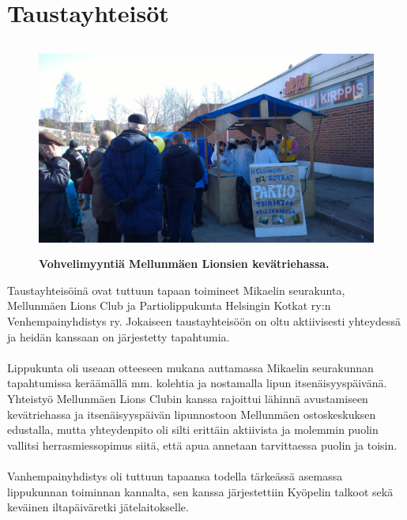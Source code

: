 \section{Taustayhteisöt}
\begin{figure}[htb]
	\begin{center}
		\includegraphics[height=7cm]{lettukestit.jpg}
	\end{center}
	\captionsetup{labelformat=empty}
	\caption{\textbf{Vohvelimyyntiä Mellunmäen Lionsien kevätriehassa.}}
\end{figure}

Taustayhteisöinä ovat tuttuun tapaan toimineet Mikaelin seurakunta, Mellunmäen Lions Club ja Partiolippukunta Helsingin Kotkat ry:n Venhempainyhdistys ry. Jokaiseen taustayhteisöön on oltu aktiivisesti yhteydessä ja heidän kanssaan on järjestetty tapahtumia.\\
\\Lippukunta oli useaan otteeseen mukana auttamassa Mikaelin seurakunnan tapahtumissa keräämällä mm. kolehtia ja nostamalla lipun itsenäisyyspäivänä. Yhteistyö Mellunmäen Lions Clubin kanssa rajoittui lähinnä avustamiseen kevätriehassa ja itsenäisyyspäivän lipunnostoon Mellunmäen ostoskeskuksen edustalla, mutta yhteydenpito oli silti erittäin aktiivista ja molemmin puolin vallitsi herrasmiessopimus siitä, että apua annetaan tarvittaessa puolin ja toisin.\\
\\Vanhempainyhdistys oli tuttuun tapaansa todella tärkeässä asemassa lippukunnan toiminnan kannalta, sen kanssa järjestettiin Kyöpelin talkoot sekä keväinen iltapäiväretki jätelaitokselle. 

